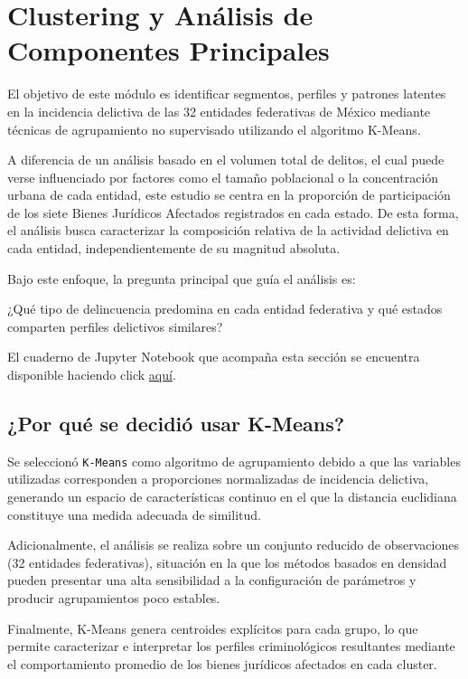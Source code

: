 \section{Clustering y Análisis de Componentes Principales}

El objetivo de este módulo es identificar segmentos, perfiles y patrones latentes en la incidencia delictiva
de las 32 entidades federativas de México mediante técnicas de agrupamiento no supervisado utilizando el algoritmo
K-Means.

A diferencia de un análisis basado en el volumen total de delitos, el cual puede verse influenciado por factores
como el tamaño poblacional o la concentración urbana de cada entidad, este estudio se centra en la proporción de
participación de los siete Bienes Jurídicos Afectados registrados en cada estado. De esta forma, el análisis busca
caracterizar la composición relativa de la actividad delictiva en cada entidad, independientemente de su magnitud
absoluta.

Bajo este enfoque, la pregunta principal que guía el análisis es:

\begin{tcolorbox}
¿Qué tipo de delincuencia predomina en cada entidad federativa y qué estados comparten perfiles delictivos similares?
\end{tcolorbox}

El cuaderno de Jupyter Notebook que acompaña esta sección se encuentra disponible haciendo click \href{https://github.com/wallsified/proyecto-final-aymdd/blob/main/notebooks/clustering.ipynb}{aquí}.

\subsection{¿Por qué se decidió usar K-Means?}

Se seleccionó \texttt{K-Means} como algoritmo de agrupamiento debido a que las variables utilizadas corresponden a proporciones
normalizadas de incidencia delictiva, generando un espacio de características continuo en el que la distancia
euclidiana constituye una medida adecuada de similitud.

Adicionalmente, el análisis se realiza sobre un conjunto reducido de observaciones (32 entidades federativas),
situación en la que los métodos basados en densidad pueden presentar una alta sensibilidad a la configuración de
parámetros y producir agrupamientos poco estables.

Finalmente, K-Means genera centroides explícitos para cada grupo, lo que permite caracterizar e interpretar los
perfiles criminológicos resultantes mediante el comportamiento promedio de los bienes jurídicos afectados en cada
cluster.

